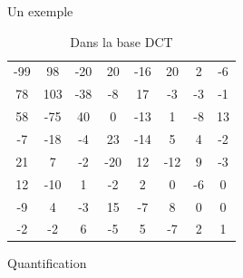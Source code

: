 \documentclass[xcolor=dvipsnames]{beamer}
\begin{document}
\begin{frame}{Un exemple}
\begin{minipage}{0.45\textwidth}
\begin{table}
            \begin{tabular}{cccccccc}
                -99 & 98 & -20 & 20 & -16 & 20 & 2 & -6\\
                78 & 103 & -38 & -8 & 17 & -3 & -3 & -1\\
                58 & -75 & 40 & 0 & -13 & 1 & -8 & 13\\
                -7 & -18 & -4 & 23 & -14 & 5 & 4 & -2\\
                21 & 7 & -2 & -20 & 12 & -12 & 9 & -3\\
                12 & -10 & 1 & -2 & 2 & 0 & -6 & 0\\
                -9 & 4 & -3 & 15 & -7 & 8 & 0 & 0\\
                -2 & -2 & 6 & -5 & 5 & -7 & 2 & 1\\
            \end{tabular}
            \caption{\centering Dans la base DCT}
        \end{table}
    \end{minipage}
    \hfill
\end{frame}


\begin{frame} {Quantification}
    \begin{figure}
        \centering
    \end{figure}
\end{frame}
\end{document}
